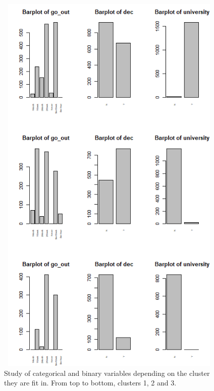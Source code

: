 \begin{figure}
  \centering
  \includegraphics[width= 11cm, height=19cm]{images/profiling/CPG_cluster_goout_university.png}
  \caption{Study of categorical and binary variables depending on the cluster they are fit in. From top to bottom, clusters 1, 2 and 3.}
  \label{fig:indiv}
\end{figure}

